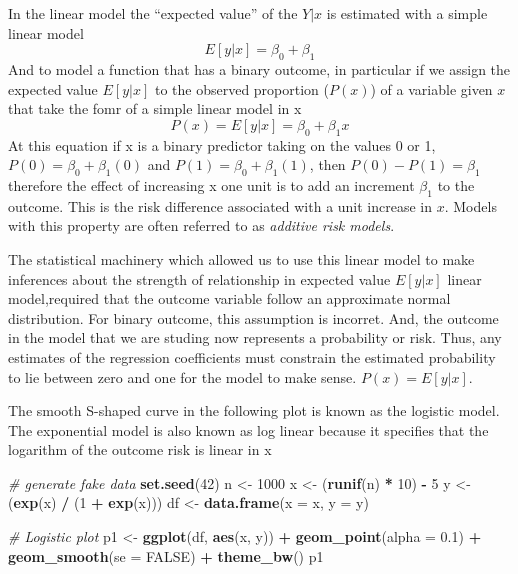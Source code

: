 \documentclass[
]{article}
\newenvironment{Shaded}{\begin{snugshade}}{\end{snugshade}}
\newcommand{\CommentTok}[1]{\textcolor[rgb]{0.56,0.35,0.01}{\textit{#1}}}
\newcommand{\DataTypeTok}[1]{\textcolor[rgb]{0.13,0.29,0.53}{#1}}
\newcommand{\DecValTok}[1]{\textcolor[rgb]{0.00,0.00,0.81}{#1}}
\newcommand{\FloatTok}[1]{\textcolor[rgb]{0.00,0.00,0.81}{#1}}
\newcommand{\KeywordTok}[1]{\textcolor[rgb]{0.13,0.29,0.53}{\textbf{#1}}}
\newcommand{\NormalTok}[1]{#1}
\newcommand{\OperatorTok}[1]{\textcolor[rgb]{0.81,0.36,0.00}{\textbf{#1}}}
\newcommand{\OtherTok}[1]{\textcolor[rgb]{0.56,0.35,0.01}{#1}}
\newcommand{\StringTok}[1]{\textcolor[rgb]{0.31,0.60,0.02}{#1}}
\begin{document}
In the linear model the ``expected value'' of the \(Y|x\) is estimated
with a simple linear model \[E[y|x]=\beta_0 + \beta_1\] And to model a
function that has a binary outcome, in particular if we assign the
expected value \(E[y|x]\) to the observed proportion (\(P(x)\)) of a
variable given \(x\) that take the fomr of a simple linear model in x
\[P(x) = E[y|x] = \beta_0 + \beta_1 x\] At this equation if x is a
binary predictor taking on the values 0 or 1,
\(P(0) = \beta_0 + \beta_1 (0)\) and \(P(1) = \beta_0 + \beta_1(1)\),
then \(P(0)-P(1) = \beta_1\) therefore the effect of increasing x one
unit is to add an increment \(\beta_1\) to the outcome. This is the risk
difference associated with a unit increase in \(x\). Models with this
property are often referred to as \emph{additive risk models}.

The statistical machinery which allowed us to use this linear model to
make inferences about the strength of relationship in expected value
\(E[y|x]\) linear model,required that the outcome variable follow an
approximate normal distribution. For binary outcome, this assumption is
incorret. And, the outcome in the model that we are studing now
represents a probability or risk. Thus, any estimates of the regression
coefficients must constrain the estimated probability to lie between
zero and one for the model to make sense. \(P(x) = E[y|x]\).

The smooth S-shaped curve in the following plot is known as the logistic
model. The exponential model is also known as log linear because it
specifies that the logarithm of the outcome risk is linear in x

\begin{Shaded}
\begin{Highlighting}[]
\CommentTok{# generate fake data}
\KeywordTok{set.seed}\NormalTok{(}\DecValTok{42}\NormalTok{)}
\NormalTok{n <-}\StringTok{ }\DecValTok{1000}
\NormalTok{x <-}\StringTok{ }\NormalTok{(}\KeywordTok{runif}\NormalTok{(n) }\OperatorTok{*}\StringTok{ }\DecValTok{10}\NormalTok{) }\OperatorTok{-}\StringTok{ }\DecValTok{5} 
\NormalTok{y <-}\StringTok{ }\NormalTok{(}\KeywordTok{exp}\NormalTok{(x) }\OperatorTok{/}\StringTok{ }\NormalTok{(}\DecValTok{1} \OperatorTok{+}\StringTok{ }\KeywordTok{exp}\NormalTok{(x)))}
\NormalTok{df <-}\StringTok{ }\KeywordTok{data.frame}\NormalTok{(}\DataTypeTok{x =}\NormalTok{ x, }\DataTypeTok{y =}\NormalTok{ y)}

\CommentTok{# Logistic plot}
\NormalTok{p1 <-}\StringTok{ }\KeywordTok{ggplot}\NormalTok{(df, }\KeywordTok{aes}\NormalTok{(x, y)) }\OperatorTok{+}
\StringTok{    }\KeywordTok{geom_point}\NormalTok{(}\DataTypeTok{alpha =} \FloatTok{0.1}\NormalTok{) }\OperatorTok{+}
\StringTok{    }\KeywordTok{geom_smooth}\NormalTok{(}\DataTypeTok{se =} \OtherTok{FALSE}\NormalTok{) }\OperatorTok{+}
\StringTok{    }\KeywordTok{theme_bw}\NormalTok{()}
\NormalTok{p1}
\end{Highlighting}
\end{Shaded}
\end{document}
